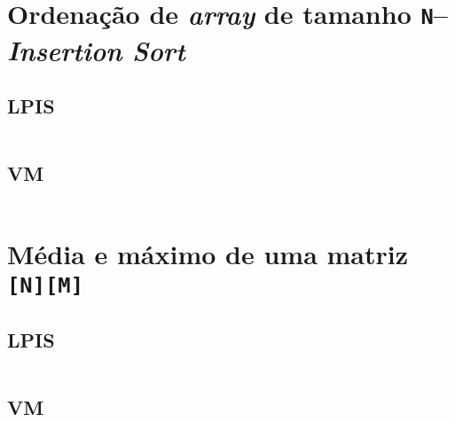 \section{Ordenação de \emph{array} de tamanho \texttt{N}--\emph{Insertion Sort}}
\label{appendix:d:sec:d4}
\subsection{LPIS}
\begin{longlisting}
	\inputminted{text}{testes/testesPedidos/04codLpis.txt}
	
\end{longlisting}

\subsection{VM}
\begin{longlisting}
	\inputminted{text}{testes/testesPedidos/04ass.txt}
	
\end{longlisting}

\section{Média e máximo de uma matriz \texttt{[N][M]}}
\label{appendix:d:sec:d5}
\subsection{LPIS}
\begin{longlisting}
	\inputminted{text}{testes/testesPedidos/05codLpis.txt}
\end{longlisting}

\subsection{VM}
\begin{longlisting}
	\inputminted{text}{testes/testesPedidos/05ass.txt}
	
\end{longlisting}





